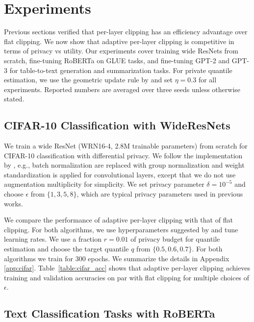 \section{Experiments}\label{sec:experiment}

Previous sections verified that per-layer clipping has an efficiency advantage over flat clipping. 
We now show that adaptive per-layer clipping is competitive in terms of privacy vs utility.
Our experiments cover training wide ResNets from scratch, fine-tuning RoBERTa on GLUE tasks, and fine-tuning GPT-2 and GPT-3 for table-to-text generation and summarization tasks. For private quantile estimation, we use the geometric update rule by \cite{andrew2019differentially} and set $\eta=0.3$ for all experiments.
Reported numbers are averaged over three seeds unless otherwise stated.



\subsection{CIFAR-10 Classification with WideResNets}\label{subsec:cifar10}

We train a wide ResNet (WRN16-4, 2.8M trainable parameters) \citep{zagoruyko2016wide} from scratch for CIFAR-10 classification with differential privacy. We follow the implementation by  \cite{de2022unlocking}, e.g.,  batch normalization are replaced with group normalization and weight standardization is applied for convolutional layers, except that we do not use augmentation multiplicity for simplicity.
We set privacy parameter $\delta= 10^{-5}$ and choose $\epsilon$ from $\{1,3,5,8\}$, which are typical privacy parameters used in previous works.

We compare the performance of adaptive per-layer clipping with that of flat clipping. 
For both algorithms, we use  hyperparameters suggested by \cite{de2022unlocking}  and tune learning rates. %
We use a fraction $r=0.01$ of privacy budget for quantile estimation and choose the target quantile $q$ from $\{0.5, 0.6, 0.7\}$. For both algorithms we train for 300 epochs. 
We summarize the details in Appendix \ref{app:cifar}.  
Table~\ref{table:cifar_acc} shows that adaptive per-layer clipping achieves  training and validation accuracies on par with flat clipping for multiple choices of $\epsilon$. %




\subsection{Text Classification Tasks with RoBERTa} \label{subsec:roberta}

